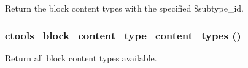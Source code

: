 \label{block_8inc_a4c1c8dd8b4c59a7efa78259046cda6b4}
Return the block content types with the specified \$subtype\_\-id. \hypertarget{block_8inc_a6cae46520409860530d99f4eebf4305b}{
\subsubsection[{ctools\_\-block\_\-content\_\-type\_\-content\_\-types}]{\setlength{\rightskip}{0pt plus 5cm}ctools\_\-block\_\-content\_\-type\_\-content\_\-types ()}}
\label{block_8inc_a6cae46520409860530d99f4eebf4305b}
Return all block content types available.

